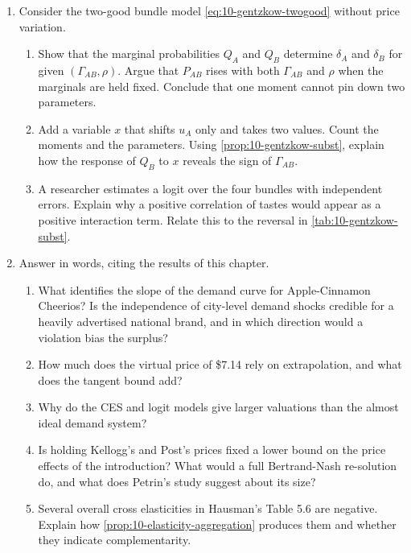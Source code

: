 \begin{enumerate}[label=\arabic*., leftmargin=*, itemsep=6pt]
\item Consider the two-good bundle model \eqref{eq:10-gentzkow-twogood} without price variation.
\begin{enumerate}[label=(\alph*)]
  \item Show that the marginal probabilities $Q_A$ and $Q_B$ determine $\delta_A$ and $\delta_B$ for given
  $(\Gamma_{AB},\rho)$. Argue that $P_{AB}$ rises with both $\Gamma_{AB}$ and $\rho$ when the marginals are held
  fixed. Conclude that one moment cannot pin down two parameters.
  \item Add a variable $x$ that shifts $u_A$ only and takes two values. Count the moments and the parameters.
  Using \cref{prop:10-gentzkow-subst}, explain how the response of $Q_B$ to $x$ reveals the sign of $\Gamma_{AB}$.
  \item A researcher estimates a logit over the four bundles with independent errors. Explain why a positive
  correlation of tastes would appear as a positive interaction term. Relate this to the reversal in
  \cref{tab:10-gentzkow-subst}.
\end{enumerate}

\item Answer in words, citing the results of this chapter.
\begin{enumerate}[label=(\alph*)]
  \item What identifies the slope of the demand curve for Apple-Cinnamon Cheerios? Is the independence of city-level
  demand shocks credible for a heavily advertised national brand, and in which direction would a violation bias the
  surplus?
  \item How much does the virtual price of \$7.14 rely on extrapolation, and what does the tangent bound add?
  \item Why do the CES and logit models give larger valuations than the almost ideal demand system?
  \item Is holding Kellogg's and Post's prices fixed a lower bound on the price effects of the introduction? What
  would a full Bertrand-Nash re-solution do, and what does Petrin's study suggest about its size?
  \item Several overall cross elasticities in Hausman's Table 5.6 are negative. Explain how
  \cref{prop:10-elasticity-aggregation} produces them and whether they indicate complementarity.
\end{enumerate}

\end{enumerate}
